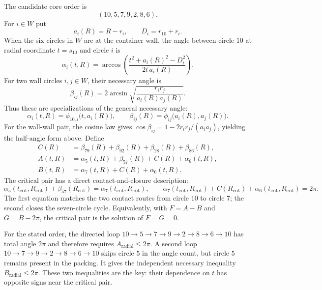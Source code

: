 \documentclass[11pt,a4paper]{article}
\theoremstyle{remark}
\begin{document}
The candidate core order is
\[
  (10,5,7,9,2,8,6).
\]
For $i\in W$ put
\[
 a_i(R)=R-r_i,\qquad D_i=r_{10}+r_i.
\]
When the six circles in $W$ are at the container wall, the angle between
circle $10$ at radial coordinate $t=s_{10}$ and circle $i$ is
\begin{equation}
  \alpha_i(t,R)=
  \arccos\!\left(
    \frac{t^2+a_i(R)^2-D_i^2}{2t\,a_i(R)}
  \right).
  \label{eq:alpha}
\end{equation}
For two wall circles $i,j\in W$, their necessary angle is
\begin{equation}
  \beta_{ij}(R)=
  2\arcsin\sqrt{\frac{r_ir_j}{a_i(R)a_j(R)}}.
  \label{eq:beta}
\end{equation}
Thus these are specializations of the general necessary angle:
\[
  \alpha_i(t,R)=\phi_{10,i}\bigl(t,a_i(R)\bigr),\qquad
  \beta_{ij}(R)=\phi_{ij}\bigl(a_i(R),a_j(R)\bigr).
\]
For the wall-wall pair, the cosine law gives
$\cos\beta_{ij}=1-2r_ir_j/(a_i a_j)$, yielding the half-angle form above.
Define
\begin{align}
 C(R)&=\beta_{79}(R)+\beta_{92}(R)+\beta_{28}(R)+\beta_{86}(R),\\
 A(t,R)&=\alpha_5(t,R)+\beta_{57}(R)+C(R)+\alpha_6(t,R),\\
 B(t,R)&=\alpha_7(t,R)+C(R)+\alpha_6(t,R).
 \label{eq:AB}
\end{align}
The critical pair has a direct contact-and-closure description:
\begin{equation}
 \alpha_5(t_{\mathrm{crit}},R_{\mathrm{crit}})
      +\beta_{57}(R_{\mathrm{crit}})
   =\alpha_7(t_{\mathrm{crit}},R_{\mathrm{crit}}),\qquad
 \alpha_7(t_{\mathrm{crit}},R_{\mathrm{crit}})
      +C(R_{\mathrm{crit}})
      +\alpha_6(t_{\mathrm{crit}},R_{\mathrm{crit}})=2\pi.
 \label{eq:critical-contact-closure}
\end{equation}
The first equation matches the two contact routes from circle $10$ to
circle $7$; the second closes the seven-circle cycle.  Equivalently, with
$F=A-B$ and $G=B-2\pi$, the critical pair is the solution of $F=G=0$.

For the stated order, the directed loop
$10\to5\to7\to9\to2\to8\to6\to10$ has total angle $2\pi$ and therefore
requires $A_{\mathrm{radial}}\le2\pi$.  A second loop
$10\to7\to9\to2\to8\to6\to10$ skips circle $5$ in the angle count, but
circle $5$ remains present in the packing.  It gives the independent
necessary inequality $B_{\mathrm{radial}}\le2\pi$.  These two inequalities
are the key: their dependence on $t$ has opposite signs near the critical
pair.
\end{document}
